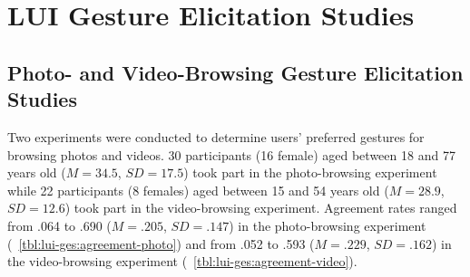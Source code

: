 \chapter{LUI Gesture Elicitation Studies} \label{app:lui-ges}


\section{Photo- and Video-Browsing Gesture Elicitation Studies}
\label{app:lui-ges:initial}
Two experiments were conducted to determine users' preferred gestures for browsing photos and videos. 30 participants (16 female) aged between 18 and 77 years old ($M{=}34.5$, $SD{=}17.5$) took part in the photo-browsing experiment while 22 participants (8 females) aged between 15 and 54 years old ($M{=}28.9$, $SD{=}12.6$) took part in the video-browsing experiment. Agreement rates ranged from .064 to .690 ($M{=}.205$, $SD{=}.147$) in the photo-browsing experiment (\tab~\ref{tbl:lui-ges:agreement-photo}) and from .052 to .593 ($M{=}.229$, $SD{=}.162$) in the video-browsing experiment (\tab~\ref{tbl:lui-ges:agreement-video}).

